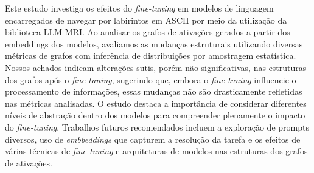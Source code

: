\begin{abstract}
  This study investigates the effects of \textit{fine-tuning} on language models tasked with navigating ASCII mazes through the use of the LLM-MRI library. By analyzing the activation graphs generated from the models' embeddings, we assess structural changes using various graph metrics with distribution inference via statistical sampling. Our findings indicate subtle, yet not significant, alterations in the graph structures after \textit{fine-tuning}, suggesting that, although \textit{fine-tuning} influences information processing, these changes are not drastically reflected in the analyzed metrics. The study highlights the importance of considering different levels of abstraction within the models to fully understand the impact of \textit{fine-tuning}. Recommended future work includes exploring diverse prompts, using \textit{embbeddings} that capture task resolution, and examining the effects of various \textit{fine-tuning} techniques and model architectures on activation graph structures.
\end{abstract}

\begin{resumo} 
  Este estudo investiga os efeitos do \textit{fine-tuning} em modelos de linguagem encarregados de navegar por labirintos em ASCII por meio da utilização da biblioteca LLM-MRI. Ao analisar os grafos de ativações gerados a partir dos embeddings dos modelos, avaliamos as mudanças estruturais utilizando diversas métricas de grafos com inferência de distribuições por amostragem estatística. Nossos achados indicam alterações sutis, porém não significativas, nas estruturas dos grafos após o \textit{fine-tuning}, sugerindo que, embora o \textit{fine-tuning} influencie o processamento de informações, essas mudanças não são drasticamente refletidas nas métricas analisadas. O estudo destaca a importância de considerar diferentes níveis de abstração dentro dos modelos para compreender plenamente o impacto do \textit{fine-tuning}. Trabalhos futuros recomendados incluem a exploração de prompts diversos, uso de \textit{embbeddings} que capturem a resolução da tarefa e os efeitos de várias técnicas de \textit{fine-tuning} e arquiteturas de modelos nas estruturas dos grafos de ativações.
\end{resumo}